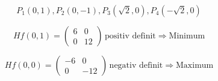 \documentclass[a4paper, ngerman, 11pt]{article}
\begin{document}
\begin{enumerate}
		\[
		P_1(0,1), P_2(0,-1), P_3(\sqrt{2},0), P_4(-\sqrt{2},0)
		\]
		
		\[
		Hf(0,1) = \begin{pmatrix} 6 & 0 \\ 0 & 12 \end{pmatrix} \, \text{positiv definit} \Rightarrow \text{Minimum}
		\]
		
		\[
		Hf(0,0) = \begin{pmatrix} -6 & 0 \\ 0 & -12 \end{pmatrix} \, \text{negativ definit} \Rightarrow \text{Maximum}
		\]
	\end{enumerate}
	
	
	
\end{document}
